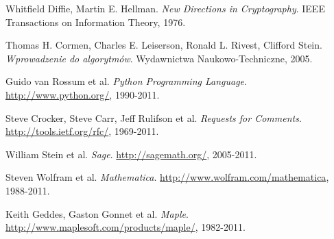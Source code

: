 \begin{thebibliography}{99}
    Whitfield Diffie, Martin E. Hellman.
    \emph{New Directions in Cryptography}.
    IEEE Transactions on Information Theory, 1976.

    Thomas H. Cormen, Charles E. Leiserson, Ronald L. Rivest, Clifford Stein.
    \emph{Wprowadzenie do algorytmów}.
    Wydawnictwa Naukowo-Techniczne, 2005.

    Guido van Rossum et al.
    \emph{Python Programming Language}.
    \url{http://www.python.org/}, 1990-2011.

    Steve Crocker, Steve Carr, Jeff Rulifson et al.
    \emph{Requests for Comments}.
    \url{http://tools.ietf.org/rfc/}, 1969-2011.

    William Stein et al.
    \emph{Sage}.
    \url{http://sagemath.org/}, 2005-2011.

    Steven Wolfram et al.
    \emph{Mathematica}.
    \url{http://www.wolfram.com/mathematica}, 1988-2011.

    Keith Geddes, Gaston Gonnet et al.
    \emph{Maple}.
    \url{http://www.maplesoft.com/products/maple/}, 1982-2011.

\end{thebibliography}
